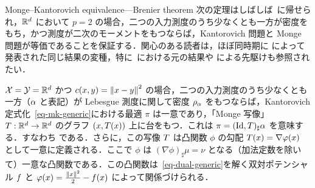 \begin{rem2}{Monge--Kantorovich equivalence---Brenier theorem}\label{rem-exist-mongemap}
次の定理はしばしば~\citet{Brenier91}に帰せられ，$\mathbb{R}^d$ において $p=2$ の場合，二つの入力測度のうち少なくとも一方が密度をもち，かつ測度が二次のモーメントをもつならば，Kantorovich 問題と Monge 問題が等価であることを保証する．関心のある読者は，ほぼ同時期に \citet{cuesta1989,ruschendorf1990characterization} によって発表された同じ結果の変種，特に~\citep{MR923203}における元の結果や \citet{knott1984optimal} による先駆けも参照されたい．

\begin{thm}[Brenier]
	$\mathcal{X}=\mathcal{Y}=\mathbb{R}^d$ かつ $c(x,y)=\left\| x-y \right\|^2$ の場合，二つの入力測度のうち少なくとも一方（$\alpha$ と表記）が Lebesgue 測度に関して密度 $\rho_{\alpha}$ をもつならば，Kantorovich 定式化~\eqref{eq-mk-generic}における最適 $\pi$ は一意であり，「Monge 写像」$T : \mathbb{R}^d \rightarrow \mathbb{R}^d$ のグラフ $(x,T(x))$ 上に台をもつ．これは $\pi = (\mathrm{Id},T)_{\sharp} \alpha$ を意味する．すなわち
である．さらに，この写像 $T$ は凸関数 $\phi$ の勾配 $T(x) = \nabla\varphi(x)$ として一意に定義される．ここで $\phi$ は $(\nabla\phi)_\sharp \mu=\nu$ となる（加法定数を除いて）一意な凸関数である．この凸関数は~\eqref{eq-dual-generic}を解く双対ポテンシャル $f$ と $\varphi(x)=\frac{\left\| x \right\|^2}{2}-f(x)$ によって関係づけられる．
\end{thm}


\end{rem2}
